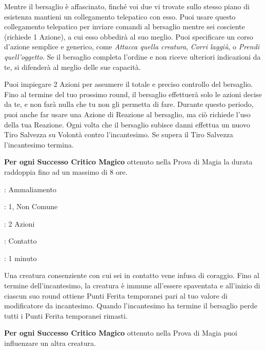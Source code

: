 \begin{multicols}{2}
Mentre il bersaglio è affascinato, finché voi due vi trovate sullo stesso piano di esistenza mantieni un collegamento telepatico con esso. Puoi usare questo collegamento telepatico per inviare comandi al bersaglio mentre sei cosciente (richiede 1 Azione), a cui esso obbedirà al suo meglio. Puoi specificare un corso d'azione semplice e generico, come \emph{Attacca quella creatura}, \emph{Corri laggiù}, o \emph{Prendi quell'oggetto}. Se il bersaglio completa l'ordine e non riceve ulteriori indicazioni da te, si difenderà al meglio delle sue capacità.

Puoi impiegare 2 Azioni per assumere il totale e preciso controllo del bersaglio. Fino al termine del tuo prossimo round, il bersaglio effettuerà solo le azioni decise da te, e non farà nulla che tu non gli permetta di fare. Durante questo periodo, puoi anche far usare una Azione di Reazione al bersaglio, ma ciò richiede l'uso della tua Reazione. Ogni volta che il bersaglio subisce danni effettua un nuovo Tiro Salvezza su Volontà contro l'incantesimo. Se supera il Tiro Salvezza l'incantesimo termina.

\textbf{Per ogni Successo Critico Magico} ottenuto nella Prova di Magia la durata raddoppia fino ad un massimo di 8 ore.

\noindent\colorbox{OBSSgold!10}{
\begin{minipage}{0.95\linewidth}
\begin{description}[noitemsep, topsep=0pt, parsep=0pt, partopsep=0pt, leftmargin=0cm, labelwidth=1.3cm]
	\item[\textbf{Lista}]: Ammaliamento
	\item[\textbf{Livello}]: 1, Non Comune
	\item[\textbf{Lancio}]: 2 Azioni
	\item[\textbf{Gittata}]: Contatto
	\item[\textbf{Durata}]: 1 minuto
\end{description}
\end{minipage}}\smallskip

Una creatura consenziente con cui sei in contatto vene infusa di coraggio. Fino al termine dell'incantesimo, la creatura è immune all'essere spaventata e all'inizio di ciascun suo round ottiene Punti Ferita temporanei pari al tuo valore di modificatore da incantesimo. Quando l'incantesimo ha termine il bersaglio perde tutti i Punti Ferita temporanei rimasti.

\textbf{Per ogni Successo Critico Magico} ottenuto nella Prova di Magia puoi influenzare un altra creatura.


\end{multicols}
